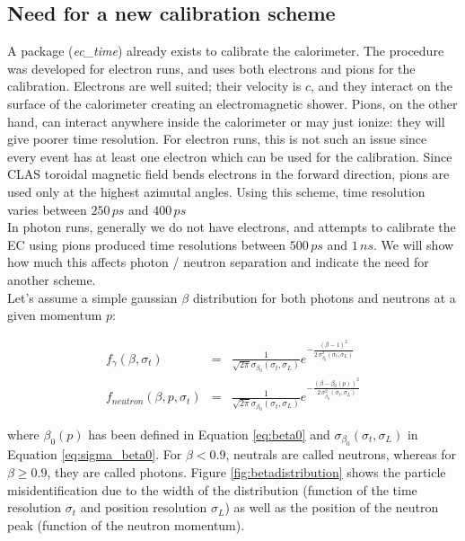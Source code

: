 \documentclass [12pt,letterpaper]{article}
\begin{document}
\subsection{Need for a new calibration scheme}
A package ({\it ec\_time}) already exists to calibrate the calorimeter. The procedure was developed for electron runs, and uses both electrons and pions for the calibration. Electrons are well suited; their velocity is $c$, and they interact on the surface of the calorimeter creating an electromagnetic shower. Pions, on the other hand, can interact anywhere inside the calorimeter or may just ionize: they will give poorer time resolution. For electron runs, this is not such an issue since every event has at least one electron which can be used for the calibration. Since CLAS toroidal magnetic field bends electrons in the forward direction, pions are used only at the highest azimutal angles. Using this scheme, time resolution varies between $250\, ps$ and $400\, ps$ \\
In photon runs, generally we do not have electrons, and attempts to calibrate the EC using pions produced time resolutions between $500\,ps$ and $1\,ns$. We will show how much this affects photon / neutron separation and indicate the need for another scheme.\\
Let's assume a simple gaussian $\beta$ distribution for both photons and neutrons at a given momentum $p$:

\begin{eqnarray}
f_{\gamma} (\beta, \sigma_t) &  = & \frac{1}{\sqrt{2\pi} \sigma_{\beta_0}(\sigma_{t}, \sigma_{L})} e^{\textstyle - \frac{ (\beta -1) ^ 2 }{ 2 \, \sigma_{\beta_0}^2(\sigma_{t}, \sigma_{L}) }} \\
f_{neutron} (\beta, p, \sigma_t) & = & \frac{1}{\sqrt{2\pi} \sigma_{\beta_0}(\sigma_{t}, \sigma_{L})} e^{\textstyle - \frac{( \beta -\beta_0(p))^2}{2\, \sigma_{\beta_0}^2(\sigma_{t}, \sigma_{L}) }}
\end{eqnarray}

where $\beta_{0}(p)$ has been defined in Equation \ref{eq:beta0} and $\sigma_{\beta_0}(\sigma_{t}, \sigma_{L})$ in Equation \ref{eq:sigma_beta0}. For $\beta < 0.9$, neutrals are called neutrons, whereas for $\beta \geq 0.9$, they are called photons. Figure \ref{fig:betadistribution} shows the particle misidentification due to the width of the distribution (function of the time resolution $\sigma_{t}$ and position resolution $\sigma_{L}$) as well as the position of the neutron peak (function of the neutron momentum).   
\end{document}
